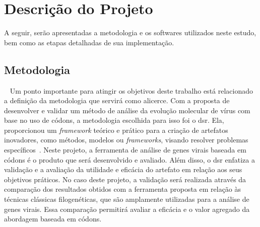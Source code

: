 
\chapter{Descrição do Projeto}




A seguir, serão apresentadas a metodologia e os softwares utilizados neste estudo, bem como as etapas detalhadas de sua implementação.

\section{Metodologia}~\label{sec:metodologia}
Um ponto importante para atingir os objetivos deste trabalho está relacionado a definição da metodologia que servirá como alicerce. Com a proposta de desenvolver e validar um método de análise da evolução molecular de vírus com base no uso de códons, a metodologia escolhida para isso foi o \gls{dsr}. Ela, proporcionou um \textit{framework} teórico e prático para a criação de artefatos inovadores, como métodos, modelos ou \textit{frameworks}, visando resolver problemas específicos~\cite{peffers_dsr_2007}. Neste projeto, a ferramenta de análise de genes virais baseada em códons é o produto que será desenvolvido e avaliado. Além disso, o \gls{dsr} enfatiza a validação e a avaliação da utilidade e eficácia do artefato em relação aos seus objetivos práticos. No caso deste projeto, a validação será realizada através da comparação dos resultados obtidos com a ferramenta proposta em relação às técnicas clássicas filogenéticas, que são amplamente utilizadas para a análise de genes virais. Essa comparação permitirá avaliar a eficácia e o valor agregado da abordagem baseada em códons.

